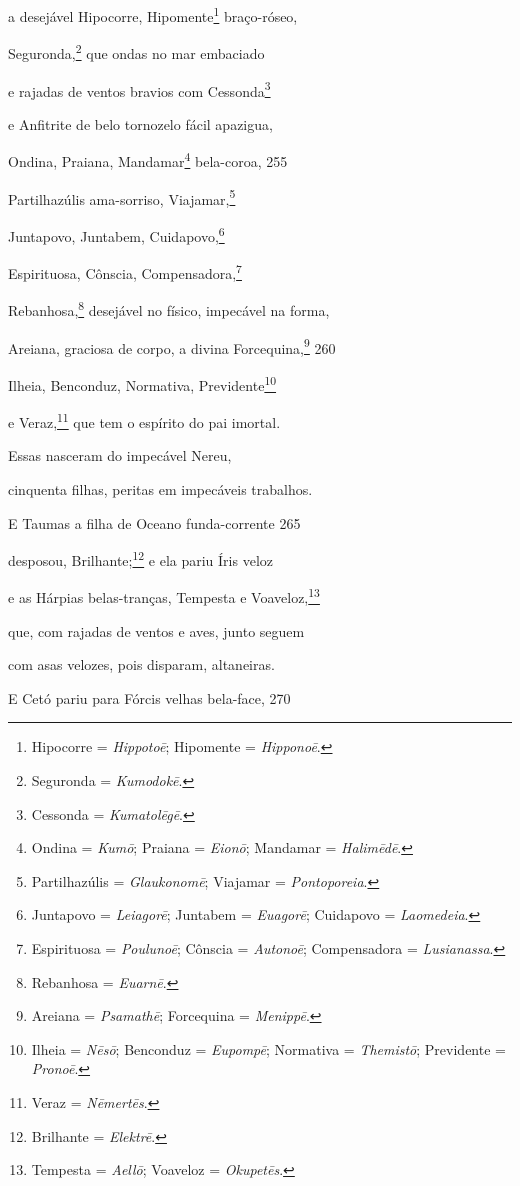 a desejável Hipocorre, Hipomente\footnote{Hipocorre = \emph{Hippotoē}; Hipomente =
\emph{Hipponoē}.} braço-róseo,

Seguronda,\footnote{Seguronda = \emph{Kumodokē}.} que ondas no mar embaciado

e rajadas de ventos bravios com Cessonda\footnote{Cessonda = \emph{Kumatolēgē}.}

e Anfitrite de belo tornozelo fácil apazigua,

Ondina, Praiana, Mandamar\footnote{Ondina = \emph{Kumō}; Praiana = \emph{Eionō}; Mandamar =
\emph{Halimēdē}.} bela-coroa, \num{255}

Partilhazúlis ama-sorriso, Viajamar,\footnote{Partilhazúlis = \emph{Glaukonomē}; Viajamar = \emph{Pontoporeia}.}

Juntapovo, Juntabem, Cuidapovo,\footnote{Juntapovo = \emph{Leiagorē}; Juntabem = \emph{Euagorē}; Cuidapovo = \emph{Laomedeia}.}

Espirituosa, Cônscia, Compensadora,\footnote{Espirituosa = \emph{Poulunoē}; Cônscia = \emph{Autonoē};
Compensadora = \emph{Lusianassa}.}

Rebanhosa,\footnote{Rebanhosa = \emph{Euarnē}.} desejável no físico, impecável na forma,

Areiana, graciosa de corpo, a divina Forcequina,\footnote{Areiana = \emph{Psamathē}; Forcequina = \emph{Menippē}.} \num{260}

Ilheia, Benconduz, Normativa, Previdente\footnote{Ilheia = \emph{Nēsō}; Benconduz = \emph{Eupompē}; Normativa =
\emph{Themistō}; Previdente = \emph{Pronoē}.}

e Veraz,\footnote{Veraz = \emph{Nēmertēs}.} que tem o espírito do pai imortal.

Essas nasceram do impecável Nereu,

cinquenta filhas, peritas em impecáveis trabalhos.

\quad{}E Taumas a filha de Oceano funda-corrente \num{265}

desposou, Brilhante;\footnote{Brilhante = \emph{Elektrē}.} e ela pariu Íris veloz

e as Hárpias belas-tranças, Tempesta e Voaveloz,\footnote{Tempesta = \emph{Aellō}; Voaveloz = \emph{Okupetēs}.}

que, com rajadas de ventos e aves, junto seguem

com asas velozes, pois disparam, altaneiras.

\medskip

E Cetó pariu para Fórcis velhas bela-face, \num{270}

